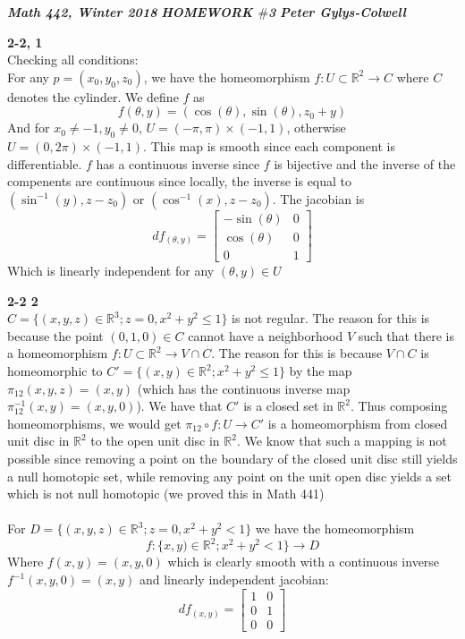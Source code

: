 \documentclass[12pt]{article}
\newenvironment{ques}[1]{\textbf{#1}\vspace{1 mm}\\ }{\bigskip}
\theoremstyle{definition}
\newcommand{\R}{\mathbb R}
\begin{document}
\noindent \textit{\textbf{Math 442, Winter 2018}} \hspace{1.3cm}
\textit{\textbf{HOMEWORK $\#$3}} \hspace{1.3cm} \textit{\textbf{Peter
Gylys-Colwell}} 

\vspace{1cm}

\begin{ques}{2-2, 1}
	Checking all conditions:\\
	For any $p = (x_0,y_0,z_0)$, we have the homeomorphism $f: U \subset \R^2 \to C$
	where $C$ denotes the cylinder. We define $f$ as
	$$f(\theta,y) = (\cos(\theta), \sin(\theta), z_0 + y)$$
	And for $x_0 \neq -1, y_0 \neq 0$, $U = (-\pi, \pi) \times (-1,1)$,
	otherwise $U =  (0, 2\pi) \times (-1,1)$. This map is smooth since each
	component is differentiable. $f$ has a continuous inverse since $f$ is
	bijective and the inverse of the compenents are continuous since locally,
	the inverse is equal to $(\sin^{-1}(y), z - z_0)$ or $(\cos^{-1}(x), z -
	z_0)$. The jacobian is
	$$
	df_{(\theta,y)} = 
	\begin{bmatrix}
	-\sin(\theta) & 0\\
	\cos(\theta) & 0\\
	0 & 1
	\end{bmatrix}
	$$
	Which is linearly independent for any $(\theta, y) \in U$
\end{ques}

\begin{ques}{2-2 2}
	$C = \{(x,y,z) \in \R^3; z = 0, x^2 + y^2 \leq 1\}$ is not regular. The reason
	for this is because the point $(0,1,0) \in C$ cannot have a neighborhood
	$V$ such that there is a homeomorphism $f:U \subset \R^2 \to V \cap C$. The
	reason for this is because $V \cap C$ is homeomorphic to $C'=\{(x,y) \in \R^2;
	x^2 + y^2 \leq 1\}$ by the map $\pi_{12}(x,y,z) = (x,y)$ (which has the
	continuous inverse map $\pi_{12}^{-1}(x,y) = (x,y,0)$). We have that $C'$
	is a closed set in $\R^2$. Thus composing homeomorphisms, we would get
	$\pi_{12} \circ f : U \to C'$ is a homeomorphism from closed unit disc in
	$\R^2$ to the open unit disc in $\R^2$. We know that such a mapping is not
	possible since removing a point on the boundary of the closed unit disc
	still yields a null homotopic set, while removing any point on the unit
	open disc yields a set which is not null homotopic (we proved this in Math 441)\\
	\\
	For $D = \{(x,y,z) \in \R^3; z = 0, x^2 + y^2 < 1\}$ we have the homeomorphism 
	$$f: \{x,y) \in \R^2; x^2 + y^2 < 1\} \to D$$
	Where $f(x,y) = (x,y,0)$ which is clearly smooth with a continuous inverse
	$f^{-1}(x,y,0) = (x,y)$ and linearly independent jacobian:
	$$
	df_{(x,y)} = 
	\begin{bmatrix}
	1 & 0\\
	0& 1\\
	0 & 0
	\end{bmatrix}
	$$
\end{ques}
\end{document}
